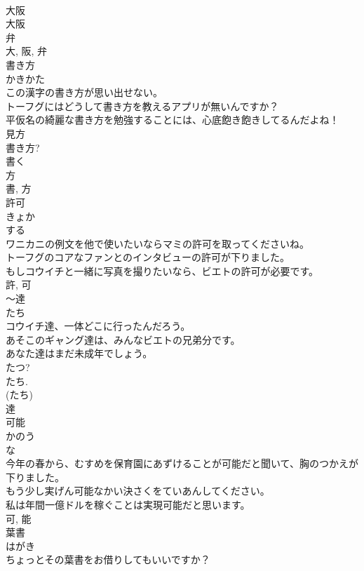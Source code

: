 \documentclass[8pt]{extreport}
\begin{document}
\begin{CJK}{UTF8}{min}
\\	大阪 
\\	大阪 
\\	弁 
\\	大, 阪, 弁	
\\	書き方	
\\	かきかた	
\\	この漢字の書き方が思い出せない。	
\\	トーフグにはどうして書き方を教えるアプリが無いんですか？	
\\	平仮名の綺麗な書き方を勉強することには、心底飽き飽きしてるんだよね！	
\\	見方 
\\	書き方? 
\\	書く 
\\	方 
\\	書, 方	
\\	許可	
\\	きょか	
\\	する 
\\	ワニカニの例文を他で使いたいならマミの許可を取ってくださいね。	
\\	トーフグのコアなファンとのインタビューの許可が下りました。	
\\	もしコウイチと一緒に写真を撮りたいなら、ビエトの許可が必要です。	
\\	許, 可	
\\	〜達	
\\	たち	
\\	コウイチ達、一体どこに行ったんだろう。	
\\	あそこのギャング達は、みんなビエトの兄弟分です。	
\\	あなた達はまだ未成年でしょう。	
\\	たつ? 
\\	たち. 
\\	(たち) 
\\	達	
\\	可能	
\\	かのう	
\\	な 
\\	今年の春から、むすめを保育園にあずけることが可能だと聞いて、胸のつかえが下りました。	
\\	もう少し実げん可能なかい決さくをていあんしてください。	
\\	私は年間一億ドルを稼ぐことは実現可能だと思います。	
\\	可, 能	
\\	葉書	
\\	はがき	
\\	ちょっとその葉書をお借りしてもいいですか？	

\end{CJK}
\end{document}
